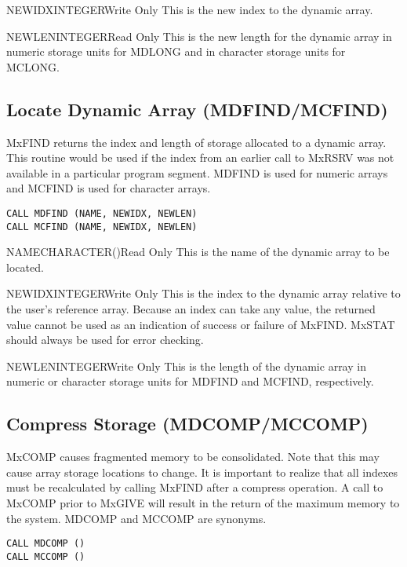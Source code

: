 \begin{argy}{NEWIDX}{INTEGER}{Write Only}
This is the new index to the dynamic array.
\end{argy}

\begin{argy}{NEWLEN}{INTEGER}{Read Only}
This is the new length for the dynamic array in numeric storage units for
MDLONG and in character storage units for MCLONG.
\end{argy}

\subsection{Locate Dynamic Array (MDFIND/MCFIND)}
MxFIND 
returns the index and length of storage allocated to a dynamic
array.  This routine would be used if the index from an earlier call to
MxRSRV was not available in a particular program segment. MDFIND
is used for numeric arrays and MCFIND is used for character arrays.
\begin{verbatim}
CALL MDFIND (NAME, NEWIDX, NEWLEN)
CALL MCFIND (NAME, NEWIDX, NEWLEN)
\end{verbatim}

\begin{argy}{NAME}{CHARACTER\last(\last)}{Read Only}
This is the name of the dynamic array to be located.
\end{argy}

\begin{argy}{NEWIDX}{INTEGER}{Write Only}
This is the index to the dynamic array relative to the user's reference
array. Because an index can take any value, the returned value cannot be
used as an indication of success or failure of MxFIND. MxSTAT should always
be used for error checking.
\end{argy}

\begin{argy}{NEWLEN}{INTEGER}{Write Only}
This is the length of the dynamic array in numeric or character storage
units for MDFIND and MCFIND, respectively.
\end{argy}

\subsection{Compress Storage (MDCOMP/MCCOMP)}
MxCOMP causes fragmented memory to be consolidated.  Note that
this may cause array storage locations to change.  It is important to
realize that all indexes must be recalculated by calling MxFIND 
after a compress operation.  A call to MxCOMP prior to
MxGIVE will result in the return of the maximum memory to the system.
MDCOMP and MCCOMP are synonyms. 
\begin{verbatim}
CALL MDCOMP ()
CALL MCCOMP ()
\end{verbatim}

